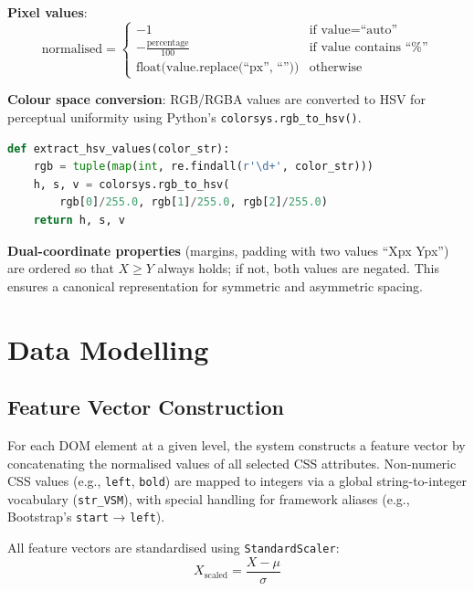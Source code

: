 \textbf{Pixel values}:
\begin{equation}
\text{normalised} = \begin{cases}
-1 & \text{if value} = \text{``auto''} \\
-\frac{\text{percentage}}{100} & \text{if value contains ``\%''} \\
\text{float(value.replace(``px'', ``''))} & \text{otherwise}
\end{cases}
\end{equation}

\textbf{Colour space conversion}: RGB/RGBA values are converted to HSV for perceptual uniformity using Python's \texttt{colorsys.rgb\_to\_hsv()}.

\begin{tcolorbox}[colback=gray!5!white, colframe=gray!60!black,
    title=\textbf{HSV Colour Space Conversion}, fonttitle=\bfseries,
    enhanced, arc=2mm, boxrule=0.5pt]
\begin{lstlisting}[language=Python]
def extract_hsv_values(color_str):
    rgb = tuple(map(int, re.findall(r'\d+', color_str)))
    h, s, v = colorsys.rgb_to_hsv(
        rgb[0]/255.0, rgb[1]/255.0, rgb[2]/255.0)
    return h, s, v
\end{lstlisting}
\end{tcolorbox}

\textbf{Dual-coordinate properties} (margins, padding with two values ``Xpx Ypx'') are ordered so that $X \geq Y$ always holds; if not, both values are negated. This ensures a canonical representation for symmetric and asymmetric spacing.

\section{Data Modelling}
\label{sec:data-modeling}

\subsection{Feature Vector Construction}

For each DOM element at a given level, the system constructs a feature vector by concatenating the normalised values of all selected CSS attributes. Non-numeric CSS values (e.g., \texttt{left}, \texttt{bold}) are mapped to integers via a global string-to-integer vocabulary (\texttt{str\_VSM}), with special handling for framework aliases (e.g., Bootstrap's \texttt{start} → \texttt{left}).

All feature vectors are standardised using \texttt{StandardScaler}:
\begin{equation}
X_{\text{scaled}} = \frac{X - \mu}{\sigma}
\end{equation}

